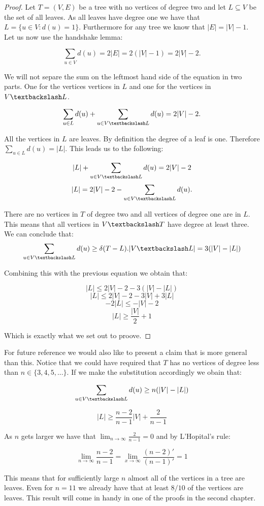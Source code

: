 \begin{proof}
    Let $T = (V, E)$ be a tree with no vertices of degree two and let $L \subseteq V$ be the set of all leaves. As all leaves have degree one we have that $L = \{u \in V: d(u) = 1\}$. Furthermore for any tree we know that $|E| = |V| - 1$. Let us now use the handshake lemma:

    $$ \sum_{u \in V}{d(u)} = 2|E| = 2(|V| - 1) = 2|V| - 2.$$

    We will not separe the sum on the leftmost hand side of the equation in two parts. One for the vertices vertices in $L$ and one for the vertices in $V\textbackslash L$.


    $$ \sum_{u \in L}{d(u)} + \sum_{u \in V\textbackslash L}{d(u)} = 2|V| - 2.$$

    All the vertices in $L$ are leaves. By definition the degree of a leaf is one. Therefore $\sum_{u \in L}{d(u)} = |L|$. This leads us to the following:

    $$  |L| + \sum_{u \in V\textbackslash L}{d(u)} = 2|V| - 2$$
    $$  |L|  = 2|V| - 2 - \sum_{u \in V\textbackslash L}{d(u)}.$$

    There are no vertices in $T$ of degree two and all vertices of degree one are in $L$. This means that all vertices in $V \textbackslash T$ have degree at least three. We can conclude that:
    $$\sum_{u \in V\textbackslash L}{d(u)} \ge \delta(T - L).|V\textbackslash L| = 3(|V| - |L|) $$

    Combining this with the previous equation we obtain that:

    $$  |L| \le 2|V| - 2 - 3(|V| - |L|)$$
    $$  |L| \le 2|V| - 2 - 3|V| + 3|L|$$
    $$  -2|L| \le -|V| - 2$$
    $$  |L| \ge \frac{|V|}{2} + 1$$

    Which is exactly what we set out to proove.


\end{proof}

For future reference we would also like to present a claim that is more general than this. Notice that we could have required that $T$ has no vertices of degree less than $n \in \{3, 4, 5, ...\}$. If we make the substitution accordingly we obain that:

    $$\sum_{u \in V\textbackslash L}{d(u)} \ge n(|V| - |L|) $$

    $$  |L| \ge \frac{n - 2}{n - 1}|V| + \frac{2}{n - 1}$$

    As $n$ gets larger we have that $ \lim_{n \to \infty}\frac{2}{n - 1} = 0$ and by L'Hopital's rule:
    
    $$\lim_{n \to \infty} \frac{n - 2}{n - 1} = \lim_{x \to \infty} \frac{(n - 2)'}{(n - 1)'} = 1$$

    This means that for sufficiently large $n$ almost all of the vertices in a tree are leaves. Even for $n = 11$ we already have that at least $8/10$ of the vertices are leaves. This result will come in handy in one of the proofs in the second chapter.
 
